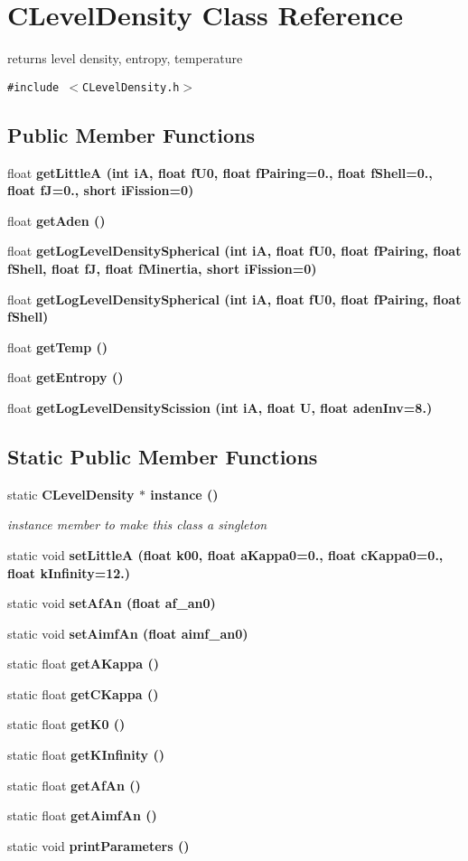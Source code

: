 \section{CLevel\-Density Class Reference}
\label{classCLevelDensity}
returns level density, entropy, temperature  


{\tt \#include $<$CLevel\-Density.h$>$}

\subsection*{Public Member Functions}
\begin{CompactItemize}
\item 
float \bf{get\-Little\-A} (int i\-A, float f\-U0, float f\-Pairing=0., float f\-Shell=0., float f\-J=0., short i\-Fission=0)
\item 
float \bf{get\-Aden} ()
\item 
float \bf{get\-Log\-Level\-Density\-Spherical} (int i\-A, float f\-U0, float f\-Pairing, float f\-Shell, float f\-J, float f\-Minertia, short i\-Fission=0)
\item 
float \bf{get\-Log\-Level\-Density\-Spherical} (int i\-A, float f\-U0, float f\-Pairing, float f\-Shell)
\item 
float \bf{get\-Temp} ()
\item 
float \bf{get\-Entropy} ()
\item 
float \bf{get\-Log\-Level\-Density\-Scission} (int i\-A, float U, float aden\-Inv=8.)
\end{CompactItemize}
\subsection*{Static Public Member Functions}
\begin{CompactItemize}
\item 
static \bf{CLevel\-Density} $\ast$ \bf{instance} ()\label{classCLevelDensity_fe25e210704d8333f87261835305e5a3}

\begin{CompactList}\small\item\em instance member to make this class a singleton \item\end{CompactList}\item 
static void \bf{set\-Little\-A} (float k00, float a\-Kappa0=0., float c\-Kappa0=0., float \bf{k\-Infinity}=12.)
\item 
static void \bf{set\-Af\-An} (float af\_\-an0)
\item 
static void \bf{set\-Aimf\-An} (float aimf\_\-an0)
\item 
static float \bf{get\-AKappa} ()
\item 
static float \bf{get\-CKappa} ()
\item 
static float \bf{get\-K0} ()
\item 
static float \bf{get\-KInfinity} ()
\item 
static float \bf{get\-Af\-An} ()
\item 
static float \bf{get\-Aimf\-An} ()
\item 
static void \bf{print\-Parameters} ()
\end{CompactItemize}
